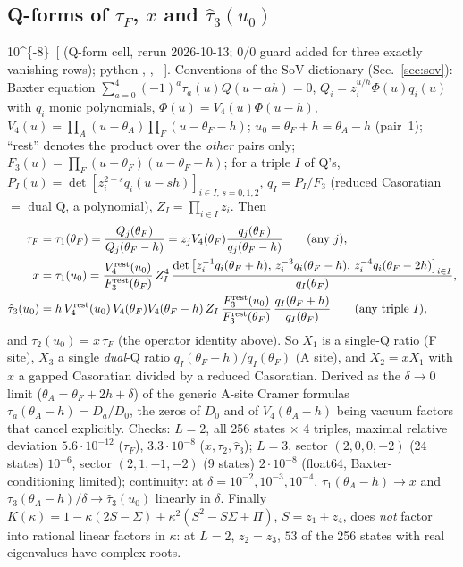 \subsection{Q-forms of $\tau_F$, $x$ and $\hat\tau_3(u_0)$}\label{sec:kappa-qform}

\num{10^{-8}}\ [ (Q-form cell, rerun 2026-10-13; $0/0$ guard added for three exactly vanishing rows); python , , --]. Conventions of the SoV dictionary (Sec.~\ref{sec:sov}): Baxter equation $\sum_{a=0}^4(-1)^a\tau_a(u)Q(u-ah)=0$,
$Q_i=z_i^{u/h}\Phi(u)q_i(u)$ with $q_i$ monic polynomials, $\Phi(u)=V_4(u)\Phi(u-h)$, $V_4(u)=\prod_A(u-\theta_A)\prod_F(u-\theta_F-h)$; $u_0=\theta_F+h=\theta_A-h$ (pair~1); ``rest'' denotes the product over the \emph{other} pairs only;
$F_3(u)=\prod_F(u-\theta_F)(u-\theta_F-h)$; for a triple $I$ of Q's, $P_I(u)=\det[z_i^{2-s}q_i(u-sh)]_{i\in I,\,s=0,1,2}$, $q_I=P_I/F_3$ (reduced Casoratian $=$ dual Q, a polynomial), $Z_I=\prod_{i\in I}z_i$. Then
\begin{align}
 \tau_F&=\tau_1(\theta_F)=\frac{Q_j(\theta_F)}{Q_j(\theta_F-h)}=z_jV_4(\theta_F)\frac{q_j(\theta_F)}{q_j(\theta_F-h)}\qquad(\text{any }j),\\
 x&=\tau_1(u_0)=\frac{V_4^{\rm rest}(u_0)}{F_3^{\rm rest}(\theta_F)}\,Z_I^4\,\frac{\det\big[z_i^{-1}q_i(\theta_F+h),\,z_i^{-3}q_i(\theta_F-h),\,z_i^{-4}q_i(\theta_F-2h)\big]_{i\in I}}{q_I(\theta_F)},\\
 \hat\tau_3(u_0)&=h\,V_4^{\rm rest}(u_0)\,V_4(\theta_F)V_4(\theta_F-h)\,Z_I\,\frac{F_3^{\rm rest}(u_0)}{F_3^{\rm rest}(\theta_F)}\,\frac{q_I(\theta_F+h)}{q_I(\theta_F)}\qquad(\text{any triple }I),
\end{align}
and $\tau_2(u_0)=x\,\tau_F$ (the operator identity above). So $X_1$ is a single-Q ratio (F site), $X_3$ a single \emph{dual}-Q ratio $q_I(\theta_F+h)/q_I(\theta_F)$ (A site), and $X_2=xX_1$ with $x$ a gapped Casoratian divided by a reduced Casoratian.
Derived as the $\delta\to0$ limit ($\theta_A=\theta_F+2h+\delta$) of the generic A-site Cramer formulas $\tau_a(\theta_A-h)=D_a/D_0$, the zeros of $D_0$ and of $V_4(\theta_A-h)$ being vacuum factors that cancel explicitly.
Checks: $L=2$, all 256 states $\times$ 4 triples, maximal relative deviation $5.6\cdot10^{-12}$ ($\tau_F$), $3.3\cdot10^{-8}$ ($x,\tau_2,\hat\tau_3$); $L=3$, sector $(2,0,0,-2)$ (24 states) $10^{-6}$, sector $(2,1,-1,-2)$ (9 states) $2\cdot10^{-8}$ (float64, Baxter-conditioning limited); continuity: at $\delta=10^{-2},10^{-3},10^{-4}$, $\tau_1(\theta_A-h)\to x$ and $\tau_3(\theta_A-h)/\delta\to\hat\tau_3(u_0)$ linearly in $\delta$.
Finally $K(\kappa)=1-\kappa(2S-\Sigma)+\kappa^2(S^2-S\Sigma+\Pi)$, $S=z_1+z_4$, does \emph{not} factor into rational linear factors in $\kappa$: at $L=2$, $z_2=z_3$, $53$ of the 256 states with real eigenvalues have complex roots.

